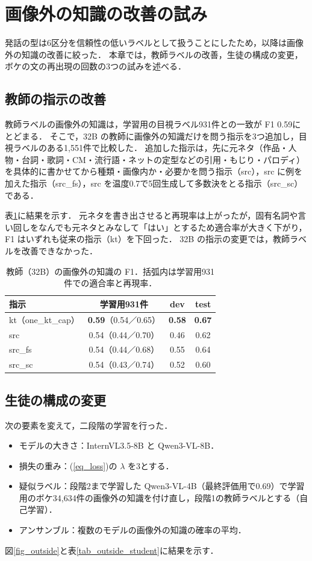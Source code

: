 \section{画像外の知識の改善の試み}
\label{sec_outside}
発話の型は6区分を信頼性の低いラベルとして扱うことにしたため，以降は画像外の知識の改善に絞った．
本章では，教師ラベルの改善，生徒の構成の変更，ボケの文の再出現の回数の3つの試みを述べる．

\subsection{教師の指示の改善}
教師ラベルの画像外の知識は，学習用の目視ラベル931件との一致が F1 0.59にとどまる．
そこで，32B の教師に画像外の知識だけを問う指示を3つ追加し，目視ラベルのある1,551件で比較した．
追加した指示は，先に元ネタ（作品・人物・台詞・歌詞・CM・流行語・ネットの定型などの引用・もじり・パロディ）を具体的に書かせてから種類・画像内か・必要かを問う指示（src），src に例を加えた指示（src\_fs），src を温度0.7で5回生成して多数決をとる指示（src\_sc）である．

表\ref{tab_outside_teacher}に結果を示す．
元ネタを書き出させると再現率は上がったが，固有名詞や言い回しをなんでも元ネタとみなして「はい」とするため適合率が大きく下がり，F1 はいずれも従来の指示（kt）を下回った．
32B の指示の変更では，教師ラベルを改善できなかった．

\begin{table}[t]
    \centering
    \caption{教師（32B）の画像外の知識の F1．括弧内は学習用931件での適合率と再現率．}
    \label{tab_outside_teacher}
    \small
    \setlength{\tabcolsep}{3pt}
    \begin{tabular}{@{}lccc@{}}
        \toprule
        指示 & 学習用931件 & dev & test \\
        \midrule
        kt（one\_kt\_cap） & \textbf{0.59}（0.54／0.65） & \textbf{0.58} & \textbf{0.67} \\
        src & 0.54（0.44／0.70） & 0.46 & 0.62 \\
        src\_fs & 0.54（0.44／0.68） & 0.55 & 0.64 \\
        src\_sc & 0.54（0.43／0.74） & 0.52 & 0.60 \\
        \bottomrule
    \end{tabular}
\end{table}

\subsection{生徒の構成の変更}
次の要素を変えて，二段階の学習を行った．
\begin{itemize}
    \item モデルの大きさ：InternVL3.5-8B と Qwen3-VL-8B．
    \item 損失の重み：(\ref{eq_loss})の $ \lambda $ を3とする．
    \item 疑似ラベル：段階2まで学習した Qwen3-VL-4B（最終評価用で0.69）で学習用のボケ34,634件の画像外の知識を付け直し，段階1の教師ラベルとする（自己学習\cite{ref_noisy_student}）．
    \item アンサンブル：複数のモデルの画像外の知識の確率の平均．
\end{itemize}
図\ref{fig_outside}と表\ref{tab_outside_student}に結果を示す．

